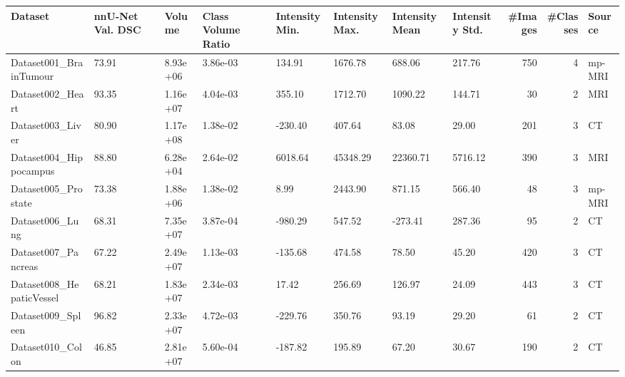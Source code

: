 \begin{tabular}{llllllllrrl}
\toprule
Dataset & nnU-Net Val. DSC & Volume & Class Volume Ratio & Intensity Min. & Intensity Max. & Intensity Mean & Intensity Std. & #Images & #Classes & Source \\
\midrule
Dataset001_BrainTumour & 73.91 & 8.93e+06 & 3.86e-03 & 134.91 & 1676.78 & 688.06 & 217.76 & 750 & 4 & mp-MRI \\
Dataset002_Heart & 93.35 & 1.16e+07 & 4.04e-03 & 355.10 & 1712.70 & 1090.22 & 144.71 & 30 & 2 & MRI \\
Dataset003_Liver & 80.90 & 1.17e+08 & 1.38e-02 & -230.40 & 407.64 & 83.08 & 29.00 & 201 & 3 & CT \\
Dataset004_Hippocampus & 88.80 & 6.28e+04 & 2.64e-02 & 6018.64 & 45348.29 & 22360.71 & 5716.12 & 390 & 3 & MRI \\
Dataset005_Prostate & 73.38 & 1.88e+06 & 1.38e-02 & 8.99 & 2443.90 & 871.15 & 566.40 & 48 & 3 & mp-MRI \\
Dataset006_Lung & 68.31 & 7.35e+07 & 3.87e-04 & -980.29 & 547.52 & -273.41 & 287.36 & 95 & 2 & CT \\
Dataset007_Pancreas & 67.22 & 2.49e+07 & 1.13e-03 & -135.68 & 474.58 & 78.50 & 45.20 & 420 & 3 & CT \\
Dataset008_HepaticVessel & 68.21 & 1.83e+07 & 2.34e-03 & 17.42 & 256.69 & 126.97 & 24.09 & 443 & 3 & CT \\
Dataset009_Spleen & 96.82 & 2.33e+07 & 4.72e-03 & -229.76 & 350.76 & 93.19 & 29.20 & 61 & 2 & CT \\
Dataset010_Colon & 46.85 & 2.81e+07 & 5.60e-04 & -187.82 & 195.89 & 67.20 & 30.67 & 190 & 2 & CT \\
\bottomrule
\end{tabular}

